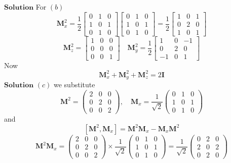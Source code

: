 \documentclass{styles/kaobook}
\begin{document}
$\boxed{\textbf{Solution}}$  For $(b)$
$$\mathbf{M}_{x}^{2}=\frac{1}{2}\left[\begin{array}{ccc}{0} & {1} & {0} \\ {1} & {0} & {1} \\ {0} & {1} & {0}\end{array}\right]\left[\begin{array}{ccc}{0} & {1} & {0} \\ {1} & {0} & {1} \\ {0} & {1} & {0}\end{array}\right]=\frac{1}{2}\left[\begin{array}{ccc}{1} & {0} & {1} \\ {0} & {2} & {0} \\ {1} & {0} & {1}\end{array}\right]$$
$$\mathbf{M}_z^2 = \left[\begin{array}{ccc}{1} & {0} & {0} \\ {0} & {0} & {0} \\ {0} & {0} & {1}\end{array}\right] \quad \mathbf{M}_y^2 = \dfrac{1}{2}\left[\begin{array}{ccc}{1} & {0} & {-1} \\ {0} & {2} & {0} \\ {-1} & {0} & {1}\end{array}\right]$$
Now
$$\mathbf{M}_x^2 + \mathbf{M}_y^2 + \mathbf{M}_z^2 = 2\mathbf{I}$$
$\boxed{\textbf{Solution}}$  $(c)$ we substitute
$$
\mathbf{M}^{2}=\left(\begin{array}{lll}
2 & 0 & 0 \\
0 & 2 & 0 \\
0 & 0 & 2
\end{array}\right), \quad \mathbf{M}_{x}=\frac{1}{\sqrt{2}}\left(\begin{array}{lll}
0 & 1 & 0 \\
1 & 0 & 1 \\
0 & 1 & 0
\end{array}\right)
$$
and
$$
\left[\mathbf{M}^{2}, \mathbf{M}_{x}\right]=\mathbf{M}^{2} \mathbf{M}_{x}-\mathbf{M}_{x} \mathbf{M}^{2}
$$
$$
\mathbf{M}^{2} \mathbf{M}_{x}=\left(\begin{array}{lll}
2 & 0 & 0 \\
0 & 2 & 0 \\
0 & 0 & 2
\end{array}\right) \times \frac{1}{\sqrt{2}}\left(\begin{array}{lll}
0 & 1 & 0 \\
1 & 0 & 1 \\
0 & 1 & 0
\end{array}\right)=\frac{1}{\sqrt{2}}\left(\begin{array}{lll}
0 & 2 & 0 \\
2 & 0 & 2 \\
0 & 2 & 0
\end{array}\right)
$$
\end{document}

